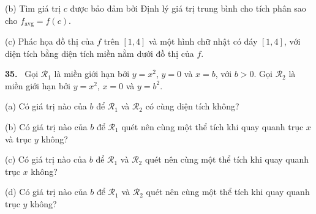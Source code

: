 \documentclass[12pt,a4paper]{article}
\newcommand{\bt}[1]{\par\smallskip\Needspace{5\baselineskip}\noindent\textbf{#1.}\ }
\begin{document}
(b) Tìm giá trị $c$ được bảo đảm bởi Định lý giá trị trung bình cho tích phân sao cho $f_{\mathrm{avg}}=f(c)$.

(c) Phác họa đồ thị của $f$ trên $[1,4]$ và một hình chữ nhật có đáy $[1,4]$, với diện tích bằng diện tích miền nằm dưới đồ thị của $f$.
\bt{35} Gọi $\mathcal R_1$ là miền giới hạn bởi $y=x^2$, $y=0$ và $x=b$, với $b>0$. Gọi $\mathcal R_2$ là miền giới hạn bởi $y=x^2$, $x=0$ và $y=b^2$.

(a) Có giá trị nào của $b$ để $\mathcal R_1$ và $\mathcal R_2$ có cùng diện tích không?

(b) Có giá trị nào của $b$ để $\mathcal R_1$ quét nên cùng một thể tích khi quay quanh trục $x$ và trục $y$ không?

(c) Có giá trị nào của $b$ để $\mathcal R_1$ và $\mathcal R_2$ quét nên cùng một thể tích khi quay quanh trục $x$ không?

(d) Có giá trị nào của $b$ để $\mathcal R_1$ và $\mathcal R_2$ quét nên cùng một thể tích khi quay quanh trục $y$ không?
\end{document}
